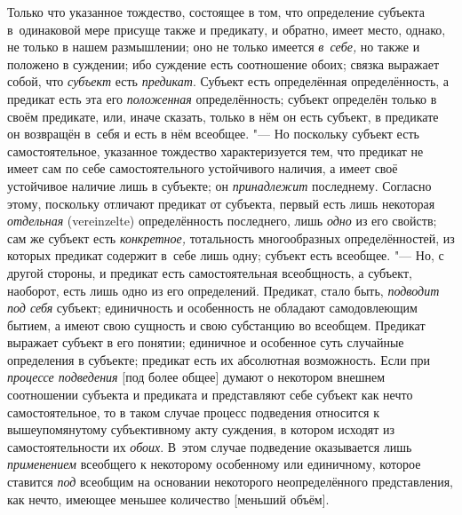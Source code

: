 Только что указанное тождество, состоящее в том, что определение субъекта
в~одинаковой мере присуще также и предикату, и обратно, имеет место, однако,
не только в нашем размышлении; оно не только имеется {\em в~себе,} но
также и положено в суждении; ибо суждение есть соотношение обоих; связка
выражает собой, что {\em субъект} есть {\em предикат}.
Субъект есть определённая определённость, а предикат есть эта его
{\em положенная} определённость; субъект определён только в своём предикате,
или, иначе сказать, только в нём он есть субъект, в предикате он возвращён
в~себя и есть в нём всеобщее. "--- Но поскольку субъект есть
самостоятельное, указанное тождество характеризуется тем, что предикат не
имеет сам по себе самостоятельного устойчивого наличия, а имеет своё
устойчивое наличие лишь в субъекте; он {\em принадлежит} последнему. Согласно
этому, поскольку отличают предикат от субъекта, первый есть лишь некоторая
{\em отдельная} (verein\-zelte) определённость последнего, лишь {\em одно} из
его свойств; сам же субъект есть {\em конкретное,} тотальность многообразных
определённостей, из которых предикат содержит в~себе лишь одну; субъект есть
всеобщее. "--- Но, с другой стороны, и предикат есть самостоятельная
всеобщность, а субъект, наоборот, есть лишь одно из его определений. Предикат,
стало быть, {\em подводит под себя} субъект; единичность и особенность не
обладают самодовлеющим бытием, а имеют свою сущность и свою субстанцию во
всеобщем. Предикат выражает субъект в его понятии; единичное и особенное суть
случайные определения в субъекте; предикат есть их абсолютная возможность.
Если при {\em процессе подведения} [под более общее] думают о некотором внешнем
соотношении субъекта и предиката и представляют себе субъект как нечто
самостоятельное, то в таком случае процесс подведения относится к
вышеупомянутому субъективному акту суждения, в котором исходят из
самостоятельности их {\em обоих}. В~этом случае подведение оказывается лишь
{\em применением} всеобщего к некоторому особенному или единичному, которое
ставится {\em под} всеобщим на основании некоторого неопределённого
представления, как нечто, имеющее меньшее количество [меньший объём].

